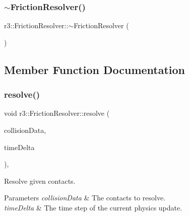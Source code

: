 \mbox{\label{classr3_1_1_friction_resolver_a49a41d6820e9c9c17447c79303296dea}} 
\subsubsection{\texorpdfstring{$\sim$\+Friction\+Resolver()}{~FrictionResolver()}}
{\footnotesize\ttfamily r3\+::\+Friction\+Resolver\+::$\sim$\+Friction\+Resolver (\begin{DoxyParamCaption}{ }\end{DoxyParamCaption})\hspace{0.3cm}{\ttfamily [default]}}



\subsection{Member Function Documentation}
\mbox{\label{classr3_1_1_friction_resolver_af26a84959e95749088f713176ec3c096}} 
\subsubsection{\texorpdfstring{resolve()}{resolve()}}
{\footnotesize\ttfamily void r3\+::\+Friction\+Resolver\+::resolve (\begin{DoxyParamCaption}\item[{\mbox{\hyperlink{classr3_1_1_collision_data}{Collision\+Data}} \&}]{collision\+Data,  }\item[{\mbox{\hyperlink{namespacer3_ab2016b3e3f743fb735afce242f0dc1eb}{real}}}]{time\+Delta }\end{DoxyParamCaption})\hspace{0.3cm}{\ttfamily [override]}, {\ttfamily [virtual]}}



Resolve given contacts. 


\begin{DoxyParams}{Parameters}
{\em collision\+Data} & The contacts to resolve. \\
\hline
{\em time\+Delta} & The time step of the current physics update. \\
\hline
\end{DoxyParams}


